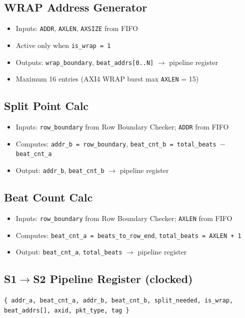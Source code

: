 \documentclass[11pt]{article}
\begin{document}
\subsection{WRAP Address Generator}
\begin{itemize}[noitemsep]
  \item Inputs: \texttt{ADDR}, \texttt{AXLEN}, \texttt{AXSIZE} from FIFO
  \item Active only when \texttt{is\_wrap = 1}
  \item Outputs: \texttt{wrap\_boundary}, \texttt{beat\_addrs[0..N]} $\rightarrow$ pipeline register
  \item Maximum 16 entries (AXI4 WRAP burst max \texttt{AXLEN} = 15)
\end{itemize}

\subsection{Split Point Calc}
\begin{itemize}[noitemsep]
  \item Inputs: \texttt{row\_boundary} from Row Boundary Checker; \texttt{ADDR} from FIFO
  \item Computes: \texttt{addr\_b = row\_boundary}, \texttt{beat\_cnt\_b = total\_beats $-$ beat\_cnt\_a}
  \item Output: \texttt{addr\_b}, \texttt{beat\_cnt\_b} $\rightarrow$ pipeline register
\end{itemize}

\subsection{Beat Count Calc}
\begin{itemize}[noitemsep]
  \item Inputs: \texttt{row\_boundary} from Row Boundary Checker; \texttt{AXLEN} from FIFO
  \item Computes: \texttt{beat\_cnt\_a = beats\_to\_row\_end}, \texttt{total\_beats = AXLEN + 1}
  \item Output: \texttt{beat\_cnt\_a}, \texttt{total\_beats} $\rightarrow$ pipeline register
\end{itemize}

\subsection{S1$\rightarrow$S2 Pipeline Register (clocked)}

\begin{center}
\texttt{\{ addr\_a, beat\_cnt\_a, addr\_b, beat\_cnt\_b, split\_needed, is\_wrap, beat\_addrs[], axid, pkt\_type, tag \}}
\end{center}
\end{document}
